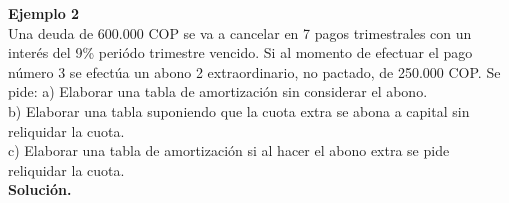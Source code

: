 \textbf{Ejemplo 2 }\\
Una deuda de  600.000 COP se va a cancelar en 7 pagos trimestrales con un interés del 9\% periódo trimestre vencido. Si al momento de efectuar el pago número 3 se efectúa un abono 2 extraordinario, no pactado, de 250.000 COP. Se pide: 
a) Elaborar una tabla de amortización sin considerar el abono.\\
b) Elaborar una tabla suponiendo que la cuota extra se abona a capital sin reliquidar la cuota. \\
c) Elaborar una tabla de amortización si al hacer el abono extra se pide reliquidar la cuota.\\

\textbf{Solución.}\\

